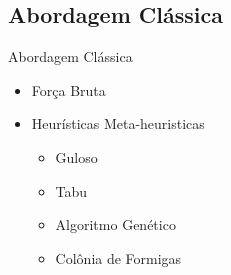 \documentclass[xcolor={dvipsnames,table}]{beamer}
\begin{document}
\subsection{Abordagem Clássica}
\begin{frame}{Abordagem Clássica}
    \begin{itemize}
        \item Força Bruta
        \item Heurísticas Meta-heuristicas
        \begin{itemize}
            \item Guloso
            \item Tabu
            \item Algoritmo Genético    
            \item Colônia de Formigas
        \end{itemize}
    \end{itemize}
\end{frame}

\end{document}
